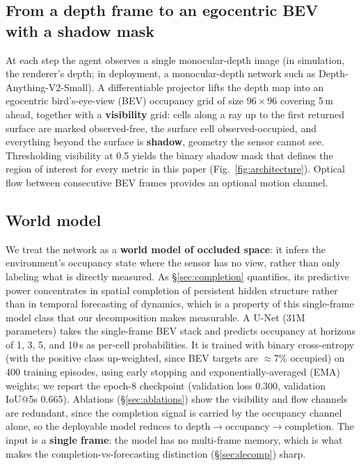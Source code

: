 \documentclass{article}
\begin{document}
\subsection{From a depth frame to an egocentric BEV with a shadow mask}
\label{sec:bev}

At each step the agent observes a single monocular-depth image (in simulation, the renderer's
depth; in deployment, a monocular-depth network such as Depth-Anything-V2-Small). A differentiable
projector lifts the depth map into an egocentric bird's-eye-view (BEV) occupancy grid of size
$96\times96$ covering 5\,m ahead, together with a \textbf{visibility} grid: cells along a ray up to
the first returned surface are marked observed-free, the surface cell observed-occupied, and
everything beyond the surface is \textbf{shadow}, geometry the sensor cannot see. Thresholding
visibility at 0.5 yields the binary shadow mask that defines the region of interest for every
metric in this paper (Fig.~\ref{fig:architecture}). Optical flow between consecutive BEV frames
provides an optional motion channel.

\subsection{World model}
\label{sec:worldmodel}

We treat the network as a \textbf{world model of occluded space}: it infers the environment's
occupancy state where the sensor has no view, rather than only labeling what is directly measured.
As \S\ref{sec:completion} quantifies, its predictive power concentrates in spatial completion of
persistent hidden structure rather than in temporal forecasting of dynamics, which is a property of
this single-frame model class that our decomposition makes measurable. A U-Net (31M parameters)
takes the single-frame BEV stack and predicts occupancy at horizons of 1, 3, 5, and 10\,s as
per-cell probabilities. It is trained with binary cross-entropy (with the positive class
up-weighted, since BEV targets are $\approx$7\% occupied) on 400 training episodes, using early
stopping and exponentially-averaged (EMA) weights; we report the epoch-8 checkpoint (validation
loss 0.300, validation IoU@5s 0.665). Ablations (\S\ref{sec:ablations}) show the visibility and
flow channels are redundant, since the completion signal is carried by the occupancy channel alone,
so the deployable model reduces to depth$\to$occupancy$\to$completion. The input is a
\textbf{single frame}: the model has no multi-frame memory, which is what makes the
completion-vs-forecasting distinction (\S\ref{sec:decomp}) sharp.
\end{document}
